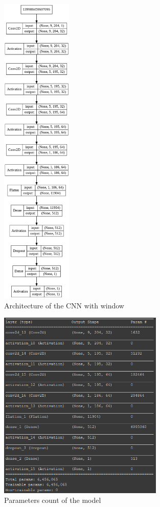 \documentclass[12pt, twoside]{article}
\begin{document}
\begin{figure}[H]
	\centering
	\includegraphics[width=0.3\textwidth]{../images/model_v3.png}
	\caption{Architecture of the CNN with window}
	\label{archiv3}
\end{figure}

\begin{figure}[H]
	\centering
	\includegraphics[width=0.7\textwidth]{../images/model_v3_params.png}
	\caption{Parameters count of the model}
	\label{paramv3}
\end{figure}
\end{document}
